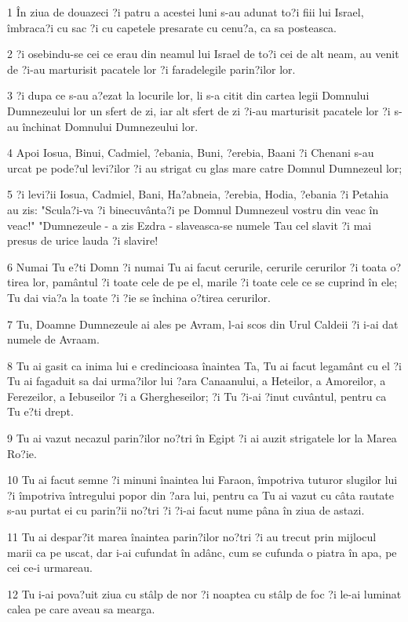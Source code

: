 \par 1 În ziua de douazeci ?i patru a acestei luni s-au adunat to?i fiii lui Israel, îmbraca?i cu sac ?i cu capetele presarate cu cenu?a, ca sa posteasca.
\par 2 ?i osebindu-se cei ce erau din neamul lui Israel de to?i cei de alt neam, au venit de ?i-au marturisit pacatele lor ?i faradelegile parin?ilor lor.
\par 3 ?i dupa ce s-au a?ezat la locurile lor, li s-a citit din cartea legii Domnului Dumnezeului lor un sfert de zi, iar alt sfert de zi ?i-au marturisit pacatele lor ?i s-au închinat Domnului Dumnezeului lor.
\par 4 Apoi Iosua, Binui, Cadmiel, ?ebania, Buni, ?erebia, Baani ?i Chenani s-au urcat pe pode?ul levi?ilor ?i au strigat cu glas mare catre Domnul Dumnezeul lor;
\par 5 ?i levi?ii Iosua, Cadmiel, Bani, Ha?abneia, ?erebia, Hodia, ?ebania ?i Petahia au zis: "Scula?i-va ?i binecuvânta?i pe Domnul Dumnezeul vostru din veac în veac!" "Dumnezeule - a zis Ezdra - slaveasca-se numele Tau cel slavit ?i mai presus de urice lauda ?i slavire!
\par 6 Numai Tu e?ti Domn ?i numai Tu ai facut cerurile, cerurile cerurilor ?i toata o?tirea lor, pamântul ?i toate cele de pe el, marile ?i toate cele ce se cuprind în ele; Tu dai via?a la toate ?i ?ie se închina o?tirea cerurilor.
\par 7 Tu, Doamne Dumnezeule ai ales pe Avram, l-ai scos din Urul Caldeii ?i i-ai dat numele de Avraam.
\par 8 Tu ai gasit ca inima lui e credincioasa înaintea Ta, Tu ai facut legamânt cu el ?i Tu ai fagaduit sa dai urma?ilor lui ?ara Canaanului, a Heteilor, a Amoreilor, a Ferezeilor, a Iebuseilor ?i a Ghergheseilor; ?i Tu ?i-ai ?inut cuvântul, pentru ca Tu e?ti drept.
\par 9 Tu ai vazut necazul parin?ilor no?tri în Egipt ?i ai auzit strigatele lor la Marea Ro?ie.
\par 10 Tu ai facut semne ?i minuni înaintea lui Faraon, împotriva tuturor slugilor lui ?i împotriva întregului popor din ?ara lui, pentru ca Tu ai vazut cu câta rautate s-au purtat ei cu parin?ii no?tri ?i ?i-ai facut nume pâna în ziua de astazi.
\par 11 Tu ai despar?it marea înaintea parin?ilor no?tri ?i au trecut prin mijlocul marii ca pe uscat, dar i-ai cufundat în adânc, cum se cufunda o piatra în apa, pe cei ce-i urmareau.
\par 12 Tu i-ai pova?uit ziua cu stâlp de nor ?i noaptea cu stâlp de foc ?i le-ai luminat calea pe care aveau sa mearga.
